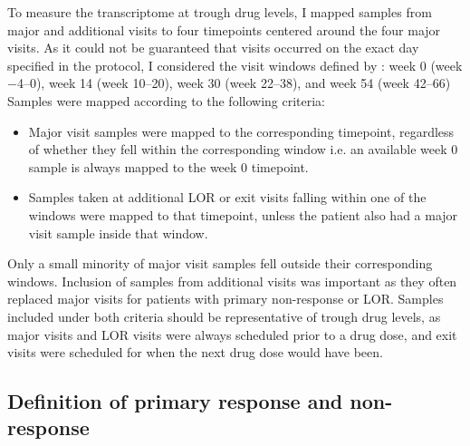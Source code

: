 To measure the transcriptome at trough drug levels, I mapped samples from major and additional visits to four timepoints centered around the four major visits.
As it could not be guaranteed that visits occurred on the exact day specified in the protocol, I considered the visit windows defined by \textcite{kennedy2019PredictorsAntiTNFTreatment}: week 0 (week \numrange{-4}{0}), week 14 (week \numrange{10}{20}), week 30 (week \numrange{22}{38}), and week 54 (week \numrange{42}{66})
Samples were mapped according to the following criteria:
\begin{itemize}
    \item Major visit samples were mapped to the corresponding timepoint, regardless of whether they fell within the corresponding window i.e. an available week 0 sample is always mapped to the week 0 timepoint.
    \item Samples taken at additional \gls{LOR} or exit visits falling within one of the windows were mapped to that timepoint, unless the patient also had a major visit sample inside that window.
\end{itemize}
Only a small minority of major visit samples fell outside their corresponding windows.
Inclusion of samples from additional visits was important as they often replaced major visits for patients with primary non-response or \gls{LOR}.
Samples included under both criteria should be representative of trough drug levels,
as major visits and \gls{LOR} visits were always scheduled prior to a drug dose,
and exit visits were scheduled for when the next drug dose would have been.

\subsection{Definition of primary response and non-response}
\label{multiPANTS:PR_definition}

